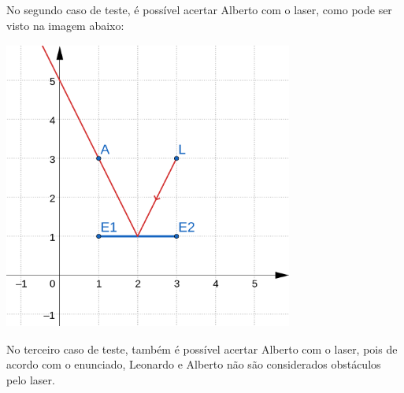 No segundo caso de teste, é possível acertar Alberto com o laser, como pode ser visto na imagem abaixo:


\begin{center}
\includegraphics[width=9.5cm, height=9.5cm]{Teste2.png}
\end{center}

No terceiro caso de teste, também é possível acertar Alberto com o laser, pois de acordo com o enunciado, Leonardo e Alberto não são considerados obstáculos pelo laser.